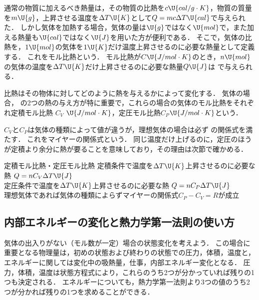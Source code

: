通常の物質に加えるべき熱量は，その物質の比熱を$c\U{cal/g\cdot K}$，物質の質量を$m\U{g}$，上昇させる温度を$\Delta T\U{K}$として$Q=mc\Delta T\U{cal}$で与えられた．
しかし気体を加熱する場合，気体の量は$\U{g}$ではなく$\U{mol}$で，また加える熱量も$\U{cal}$ではなく$\U{J}$を用いた方が便利である．
{\gtfamily そこで，気体の比熱を，$1\U{mol}$の気体を$1\U{K}$だけ温度上昇させるのに必要な熱量として定義する．}
これを{\gtfamily モル比熱}という．
モル比熱が$C\U{J/mol\cdot K}$のとき，$n\U{mol}$の気体の温度を$\Delta T\U{K}$だけ上昇させるのに必要な熱量$Q\U{J}$は
で与えられる．

比熱はその物体に対してどのように熱を与えるかによって変化する．
気体の場合，
の2つの熱の与え方が特に重要で，これらの場合の気体のモル比熱をそれぞれ{\gtfamily 定積モル比熱} \mbox{\boldmath $C_V$} {\gtfamily $\U{J/mol\cdot K}$，定圧モル比熱}\mbox{\boldmath $C_P$}{\gtfamily $\U{J/mol\cdot K}$}という．

$C_V$と$C_P$は気体の種類によって値が違うが，理想気体の場合は必ず
の関係式を満たす．
これを{\gtfamily マイヤーの関係式}という．
{\gtfamily 同じ温度だけ上げるのに，定圧のほうが定積より余分に熱が要る}ことを意味しており，その理由は次節で確かめる．

\begin{matome}{定積モル比熱・定圧モル比熱}
 \hspace{3mm} 定積条件で温度を$\Delta T\U{K}$上昇させるのに必要な熱\hspace{5mm} $Q=nC_V\Delta T\U{J}$\\
 \hspace{3mm} 定圧条件で温度を$\Delta T\U{K}$上昇させるのに必要な熱\hspace{5mm} $Q=nC_P\Delta T\U{J}$\\
 \hspace{3mm} 理想気体であれば気体の種類によらずマイヤーの関係式$C_P-C_V=R$が成立
\end{matome}

\subsection{内部エネルギーの変化と熱力学第一法則の使い方}

気体の出入りがない（モル数が一定）場合の状態変化を考えよう．
この場合に重要となる物理量は，初めの状態および終わりの状態での{\gtfamily 圧力，体積，温度}と，エネルギーに関しては変化中の{\gtfamily 吸熱量，仕事，内部エネルギー変化}となる．
圧力，体積，温度は状態方程式により，これらのうち2つが分かっていれば残りの1つも決定される．
エネルギーについても，熱力学第一法則より3つの値のうち2つが分かれば残りの1つを求めることができる．

